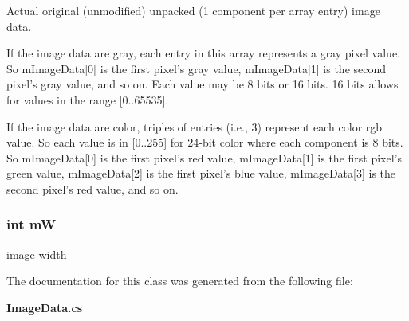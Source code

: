 Actual original (unmodified) unpacked (1 component per array entry) image data. 

If the image data are gray, each entry in this array represents a gray pixel value. So m\-Image\-Data[0] is the first pixel's gray value, m\-Image\-Data[1] is the second pixel's gray value, and so on. Each value may be 8 bits or 16 bits. 16 bits allows for values in the range [0..65535]. \par
 \par
 If the image data are color, triples of entries (i.e., 3) represent each color rgb value. So each value is in [0..255] for 24-bit color where each component is 8 bits. So m\-Image\-Data[0] is the first pixel's red value, m\-Image\-Data[1] is the first pixel's green value, m\-Image\-Data[2] is the first pixel's blue value, m\-Image\-Data[3] is the second pixel's red value, and so on. 
\subsubsection{\setlength{\rightskip}{0pt plus 5cm}int {\bf m\-W}\hspace{0.3cm}{\tt  [protected]}}\label{class_c_s_image_viewer_1_1_image_data_b636a8ca59ea2d07827db0b24b129ccb}


image width 



The documentation for this class was generated from the following file:\begin{CompactItemize}
\item 
{\bf Image\-Data.cs}\end{CompactItemize}
